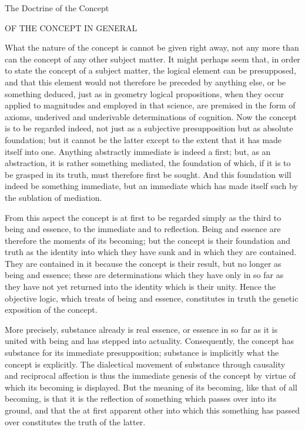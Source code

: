 
The Doctrine of the Concept

OF THE CONCEPT IN GENERAL

What the nature of the concept is cannot be given right away,
not any more than can the concept of any other subject matter.
It might perhaps seem that, in order to state the concept of a subject matter,
the logical element can be presupposed, and that this element would not
therefore be preceded by anything else, or be something deduced,
just as in geometry logical propositions, when they occur applied to
magnitudes and employed in that science, are premised in the form of axioms,
underived and underivable determinations of cognition.
Now the concept is to be regarded indeed, not just as
a subjective presupposition but as absolute foundation;
but it cannot be the latter except to the extent that
it has made itself into one.
Anything abstractly immediate is indeed a first;
but, as an abstraction, it is rather something mediated, the foundation of which,
if it is to be grasped in its truth, must therefore first be sought.
And this foundation will indeed be something immediate,
but an immediate which has made itself such by the sublation of mediation.

From this aspect the concept is at first to be regarded simply
as the third to being and essence, to the immediate and to reflection.
Being and essence are therefore the moments of its becoming;
but the concept is their foundation and truth as the identity
into which they have sunk and in which they are contained.
They are contained in it because the concept is their result,
but no longer as being and essence;
these are determinations which they have only in so far as
they have not yet returned into the identity which is their unity.
Hence the objective logic, which treats of being and essence,
constitutes in truth the genetic exposition of the concept.

More precisely, substance already is real essence,
or essence in so far as it is united with being
and has stepped into actuality.
Consequently, the concept has substance
for its immediate presupposition;
substance is implicitly what the concept is explicitly.
The dialectical movement of substance
through causality and reciprocal affection
is thus the immediate genesis of the concept
by virtue of which its becoming is displayed.
But the meaning of its becoming,
like that of all becoming,
is that it is the reflection of something
which passes over into its ground,
and that the at first apparent other
into which this something has passed over
constitutes the truth of the latter.

